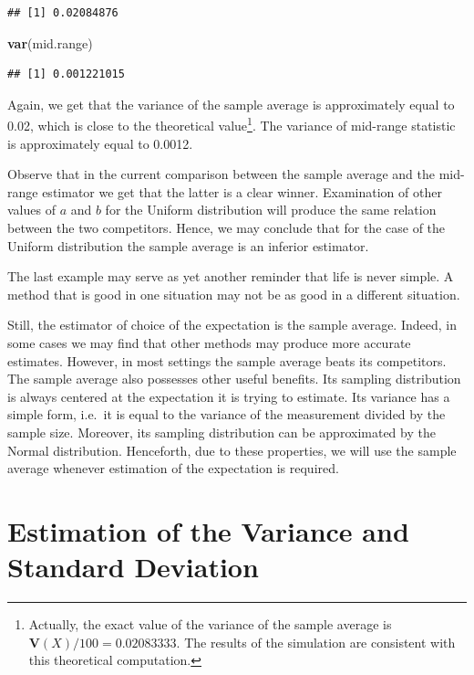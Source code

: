\documentclass[
]{krantz}
\makeatletter
\newenvironment{Shaded}{\begin{snugshade}}{\end{snugshade}}
\newcommand{\KeywordTok}[1]{\textcolor[rgb]{0.13,0.29,0.53}{\textbf{#1}}}
\newcommand{\NormalTok}[1]{#1}
\newcommand{\Var}{\mathbf{V}}
\newenvironment{kframe}{%
\medskip{}
\setlength{\fboxsep}{.8em}
 \def\at@end@of@kframe{}%
 \ifinner\ifhmode%
  \def\at@end@of@kframe{\end{minipage}}%
  \begin{minipage}{\columnwidth}%
 \fi\fi%
 \def\FrameCommand##1{\hskip\@totalleftmargin \hskip-\fboxsep
 \colorbox{shadecolor}{##1}\hskip-\fboxsep
     \hskip-\linewidth \hskip-\@totalleftmargin \hskip\columnwidth}%
 \MakeFramed {\advance\hsize-\width
   \@totalleftmargin\z@ \linewidth\hsize
   \@setminipage}}%
 {\par\unskip\endMakeFramed%
 \at@end@of@kframe}
\renewenvironment{Shaded}{\begin{kframe}}{\end{kframe}}
\theoremstyle{definition}
\theoremstyle{definition}
\theoremstyle{definition}
\theoremstyle{remark}
\makeatother
\begin{document}
\begin{verbatim}
## [1] 0.02084876
\end{verbatim}

\begin{Shaded}
\begin{Highlighting}[]
\KeywordTok{var}\NormalTok{(mid.range)}
\end{Highlighting}
\end{Shaded}

\begin{verbatim}
## [1] 0.001221015
\end{verbatim}

Again, we get that the variance of the sample average is approximately
equal to 0.02, which is close to the theoretical value\footnote{Actually, the exact value of the variance of the sample average is
  \(\Var(X)/100 = 0.02083333\). The results of the simulation are
  consistent with this theoretical computation.}. The variance
of mid-range statistic is approximately equal to 0.0012.

Observe that in the current comparison between the sample average and
the mid-range estimator we get that the latter is a clear winner.
Examination of other values of \(a\) and \(b\) for the Uniform distribution
will produce the same relation between the two competitors. Hence, we
may conclude that for the case of the Uniform distribution the sample
average is an inferior estimator.

The last example may serve as yet another reminder that life is never
simple. A method that is good in one situation may not be as good in a
different situation.

Still, the estimator of choice of the expectation is the sample average.
Indeed, in some cases we may find that other methods may produce more
accurate estimates. However, in most settings the sample average beats
its competitors. The sample average also possesses other useful
benefits. Its sampling distribution is always centered at the
expectation it is trying to estimate. Its variance has a simple form,
i.e.~it is equal to the variance of the measurement divided by the
sample size. Moreover, its sampling distribution can be approximated by
the Normal distribution. Henceforth, due to these properties, we will
use the sample average whenever estimation of the expectation is
required.

\hypertarget{estimation-of-the-variance-and-standard-deviation}{%
\section{Estimation of the Variance and Standard Deviation}\label{estimation-of-the-variance-and-standard-deviation}}
\end{document}
